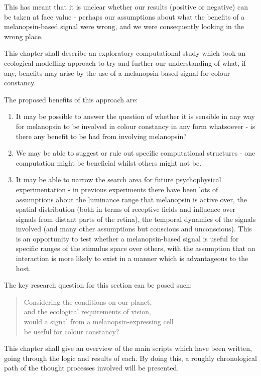 This has meant that it is unclear whether our results (positive or negative) can be taken at face value - perhaps our assumptions about what the benefits of a melanopsin-based signal were wrong, and we were consequently looking in the wrong place.

This chapter shall describe an exploratory computational study which took an ecological modelling approach to try and further our understanding of what, if any, benefits may arise by the use of a melanopsin-based signal for colour constancy.

\noindent The proposed benefits of this approach are: 
\begin{enumerate}
    \item It may be possible to answer the question of whether it is sensible in any way for melanopsin to be involved in colour constancy in any form whatsoever - is there any benefit to be had from involving melanopsin?
    \item We may be able to suggest or rule out specific computational structures - one computation might be beneficial whilst others might not be.
    \item It may be able to narrow the search area for future psychophysical experimentation - in previous experiments there have been lots of assumptions about the luminance range that melanopsin is active over, the spatial distribution (both in terms of receptive fields and influence over signals from distant parts of the retina), the temporal dynamics of the signals involved (and many other assumptions but conscious and unconscious). This is an opportunity to test whether a melanopsin-based signal is useful for specific ranges of the stimulus space over others, with the assumption that an interaction is more likely to exist in a manner which is advantageous to the host.
\end{enumerate}

\noindent The key research question for this section can be posed such:

\begin{quote}
Considering the conditions on our planet, \\
and the ecological requirements of vision, \\
would a signal from a melanopsin-expressing cell \\
be useful for colour constancy?
\end{quote}

This chapter shall give an overview of the main scripts which have been written, going through the logic and results of each. By doing this, a roughly chronological path of the thought processes involved will be presented.

